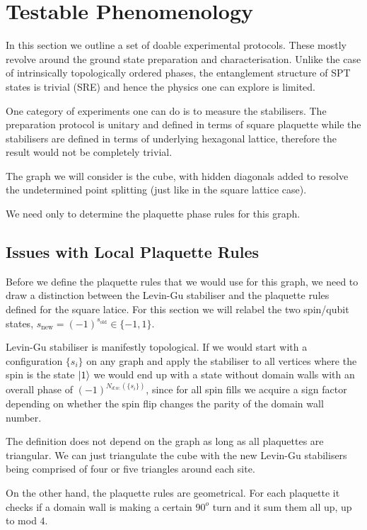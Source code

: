 \documentclass[a4paper,twocolumn,11pt]{quantumarticle}
\begin{document}
\section{Testable Phenomenology}

In this section we outline a set of doable experimental protocols. These mostly revolve around the ground state preparation and characterisation.
Unlike the case of intrinsically topologically ordered phases, the entanglement structure of SPT states is trivial (SRE) and hence the physics one can explore is limited.

One category of experiments one can do is to measure the stabilisers. The preparation protocol is unitary and defined in terms of square plaquette while the stabilisers are defined in terms of underlying hexagonal lattice, therefore the result would not be completely trivial.

The graph we will consider is the cube, with hidden diagonals added to resolve the undetermined point splitting (just like in the square lattice case).

We need only to determine the plaquette phase rules for this graph.

\subsection{Issues with Local Plaquette Rules}

Before we define the plaquette rules that we would use for this graph, we need to draw a distinction between the Levin-Gu stabiliser and the plaquette rules defined for the square latice. For this section we will relabel the two spin/qubit states, $s_\text{new} = (-1)^{s_\text{old}} \in \{-1, 1\}$.

Levin-Gu stabiliser is manifestly topological. If we would start with a configuration $\{s_i\}$ on any graph and apply the stabiliser to all vertices where the spin is  the state $\ket{1}$ we would end up with a state without domain walls with an overall phase of $(-1)^{N_{d.w.}(\{s_i\})}$, since for all spin fills we acquire a sign factor depending on whether the spin flip changes the parity of the domain wall number. 

The definition does not depend on the graph as long as all plaquettes are triangular. We can just triangulate the cube with the new Levin-Gu stabilisers being comprised of four or five triangles around each site.

On the other hand, the plaquette rules are geometrical. For each plaquette it checks if a domain wall is making a certain $90^o$ turn and it sum them all up, up to mod $4$.
\end{document}
